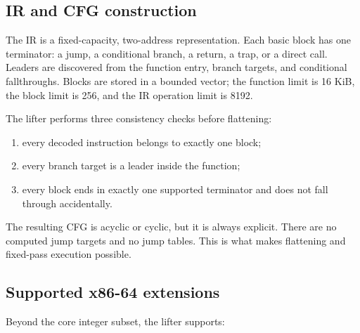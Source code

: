 \subsection{IR and CFG construction}

The IR is a fixed-capacity, two-address representation. Each basic block has one
terminator: a jump, a conditional branch, a return, a trap, or a direct call.
Leaders are discovered from the function entry, branch targets, and conditional
fallthroughs. Blocks are stored in a bounded vector; the function limit is
16 KiB, the block limit is 256, and the IR operation limit is 8192.

The lifter performs three consistency checks before flattening:

\begin{enumerate}
  \item every decoded instruction belongs to exactly one block;
  \item every branch target is a leader inside the function;
  \item every block ends in exactly one supported terminator and does not fall
        through accidentally.
\end{enumerate}

The resulting CFG is acyclic or cyclic, but it is always explicit. There are no
computed jump targets and no jump tables. This is what makes flattening and
fixed-pass execution possible.

\subsection{Supported x86-64 extensions}

Beyond the core integer subset, the lifter supports:

